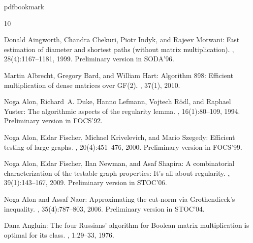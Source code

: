 %
%
%
%
%
\providecommand{\bibhead}[1]{}
%
\expandafter\ifx\csname pdfbookmark\endcsname\relax%
  \providecommand{\tocrefpdfbookmark}{}
\else\providecommand{\tocrefpdfbookmark}{%
   \hypertarget{tocreferences}{}%
   \pdfbookmark[1]{References}{tocreferences}}%
\fi

\tocrefpdfbookmark
\begin{thebibliography}{10}

\bibhead{aingworth}
{\sc Donald Aingworth, Chandra Chekuri, Piotr Indyk, and Rajeev Motwani}: Fast
  estimation of diameter and shortest paths (without matrix multiplication).
, 28(4):1167--1181, 1999.
\newblock Preliminary version in SODA'96.
\newblock [\epfmtdoi{10.1137/S0097539796303421}]

\bibhead{bard2}
{\sc Martin Albrecht, Gregory Bard, and William Hart}: Algorithm 898:
  {Efficient} multiplication of dense matrices over {GF(2)}.
, 37(1), 2010.
\newblock [\epfmtdoi{10.1145/1644001.1644010}]

\bibhead{ADLRY}
{\sc Noga Alon, Richard~A. Duke, Hanno Lefmann, Vojtech R{\"o}dl, and Raphael
  Yuster}: The algorithmic aspects of the regularity lemma.
, 16(1):80--109, 1994.
\newblock Preliminary version in FOCS'92.

\bibhead{AFKS}
{\sc Noga Alon, Eldar Fischer, Michael Krivelevich, and Mario Szegedy}:
  Efficient testing of large graphs.
, 20(4):451--476, 2000.
\newblock Preliminary version in FOCS'99.
\newblock [\epfmtdoi{10.1007/s004930070001}]

\bibhead{AFNS}
{\sc Noga Alon, Eldar Fischer, Ilan Newman, and Asaf Shapira}: A combinatorial
  characterization of the testable graph properties: {It's} all about
  regularity.
, 39(1):143--167, 2009.
\newblock Preliminary version in STOC'06.
\newblock [\epfmtdoi{10.1137/060667177}]

\bibhead{AN04}
{\sc Noga Alon and Assaf Naor}: Approximating the cut-norm via {G}rothendieck's
  inequality.
, 35(4):787--803, 2006.
\newblock Preliminary version in STOC'04.
\newblock [\epfmtdoi{10.1137/S0097539704441629}]

\bibhead{Angluin}
{\sc Dana Angluin}: The four {R}ussians' algorithm for {B}oolean matrix
  multiplication is optimal for its class.
, 1:29--33, 1976.
\newblock [\epfmtdoi{10.1145/1008591.1008593}]


\end{thebibliography}
